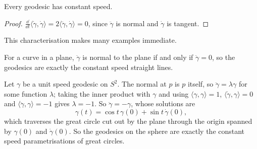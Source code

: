 \begin{corollary}
    Every geodesic has constant speed.
\end{corollary}
\begin{proof}
    $\frac{\dd}{\dd t}\langle \dot\gamma,\dot\gamma\rangle = 2\langle \ddot\gamma, \dot\gamma\rangle = 0$, since $\ddot\gamma$ is normal and $\dot\gamma$ is tangent.
\end{proof}

This characterisation makes many examples immediate.

\begin{example}
    For a curve in a plane, $\ddot\gamma$ is normal to the plane if and only if $\ddot\gamma = 0$, so the geodesics are exactly the constant speed straight lines.
\end{example}

\begin{example}
    Let $\gamma$ be a unit speed geodesic on $S^2$. The normal at $p$ is $p$ itself, so $\ddot\gamma = \lambda\gamma$ for some function $\lambda$; taking the inner product with $\gamma$ and using $\langle\gamma,\gamma\rangle = 1$, $\langle\dot\gamma,\gamma\rangle = 0$ and $\langle\ddot\gamma,\gamma\rangle = -1$ gives $\lambda = -1$. So $\ddot\gamma = -\gamma$, whose solutions are
    $$
    \gamma(t) = \cos t\, \gamma(0) + \sin t\, \dot\gamma(0),
    $$
    which traverses the great circle cut out by the plane through the origin spanned by $\gamma(0)$ and $\dot\gamma(0)$. So the geodesics on the sphere are exactly the constant speed parametrisations of great circles.
\end{example}

